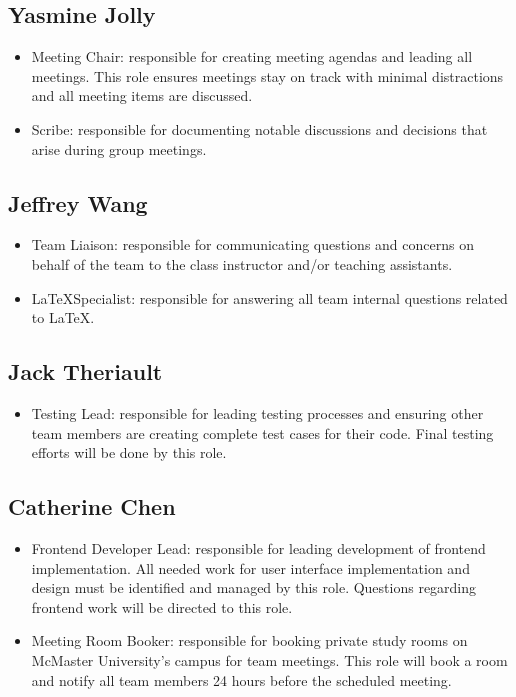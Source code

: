 \documentclass{article}
\begin{document}
\subsection{Yasmine Jolly}

\begin{itemize}
	\item Meeting Chair: responsible for creating meeting agendas and leading all meetings. This role ensures meetings stay on track with minimal distractions and all meeting items are discussed. 
	\item Scribe: responsible for documenting notable discussions and decisions that arise during group meetings.
\end{itemize}

\subsection{Jeffrey Wang}

\begin{itemize}
	\item Team Liaison: responsible for communicating questions and concerns on behalf of the team to the class instructor and/or teaching assistants. 
	\item \LaTeX Specialist: responsible for answering all team internal questions related to \LaTeX. 
\end{itemize}

\subsection{Jack Theriault}

\begin{itemize}
	\item Testing Lead: responsible for leading testing processes and ensuring other team members are creating complete test cases for their code. Final testing efforts will be done by this role.
\end{itemize}

\subsection{Catherine Chen}

\begin{itemize}
	\item Frontend Developer Lead: responsible for leading development of frontend implementation. All needed work for user interface implementation and design must be identified and managed by this role. Questions regarding frontend work will be directed to this role.
	\item Meeting Room Booker: responsible for booking private study rooms on McMaster University's campus for team meetings. This role will book a room and notify all team members 24 hours before the scheduled meeting.
\end{itemize}
\end{document}
